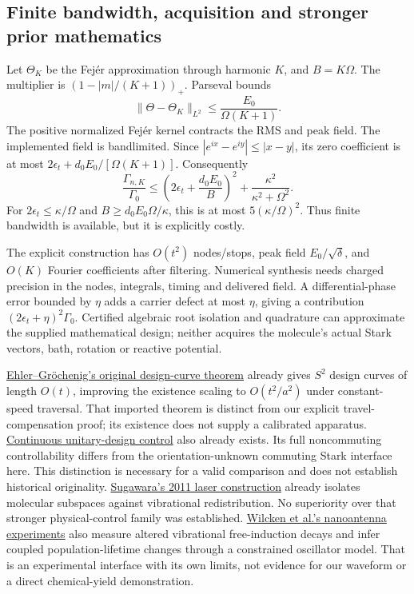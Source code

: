 \documentclass[11pt]{article}
\begin{document}
\subsection{Finite bandwidth, acquisition and stronger prior mathematics}

Let $\Theta_K$ be the Fej\'er approximation through harmonic $K$, and
$B=K\Omega$. The multiplier is $(1-|m|/(K+1))_+$.
Parseval bounds
\[
 \|\Theta-\Theta_K\|_{L^2}\le\frac{E_0}{\Omega(K+1)}.
\]
The positive normalized Fej\'er kernel contracts the RMS and peak field.
The implemented field is bandlimited. Since
$|e^{ix}-e^{iy}|\le|x-y|$, its zero coefficient is at most
$2\epsilon_t+d_0E_0/[\Omega(K+1)]$. Consequently
\begin{equation}\label{eq:bandwidth}
 \frac{\Gamma_{n,K}}{\Gamma_0}
 \le\left(2\epsilon_t+\frac{d_0E_0}{B}\right)^2
       +\frac{\kappa^2}{\kappa^2+\Omega^2}.
\end{equation}
For $2\epsilon_t\le\kappa/\Omega$ and
$B\ge d_0E_0\Omega/\kappa$, this is at most $5(\kappa/\Omega)^2$.
Thus finite bandwidth is available, but it is explicitly costly.

The explicit construction has $O(t^2)$ nodes/stops, peak field
$E_0/\sqrt\delta$, and $O(K)$ Fourier coefficients after filtering.
Numerical synthesis needs charged precision in the nodes, integrals, timing
and delivered field. A differential-phase error bounded by $\eta$ adds a
carrier defect at most $\eta$, giving a contribution
$(2\epsilon_t+\eta)^2\Gamma_0$. Certified algebraic root isolation and
quadrature can approximate the supplied mathematical design; neither acquires
the molecule's actual Stark vectors, bath, rotation or reactive potential.

\href{https://arxiv.org/abs/2306.13152}{Ehler--Gr\"ochenig's original design-curve theorem}
already gives $S^2$ design curves of length $O(t)$, improving the existence
scaling to $O(t^2/a^2)$ under constant-speed traversal.
That imported theorem is distinct from our explicit travel-compensation proof;
its existence does not supply a calibrated apparatus.
\href{https://arxiv.org/html/2601.01988v1}{Continuous unitary-design control}
also already exists. Its full noncommuting controllability differs from the
orientation-unknown commuting Stark interface here. This distinction is
necessary for a valid comparison and does not establish historical originality.
\href{https://doi.org/10.1155/2011/584082}{Sugawara's 2011 laser construction}
already isolates molecular subspaces against vibrational redistribution.
No superiority over that stronger physical-control family was established.
\href{https://doi.org/10.1073/pnas.2220852120}{Wilcken et al.'s nanoantenna experiments}
also measure altered vibrational free-induction decays and infer coupled
population-lifetime changes through a constrained oscillator model. That is
an experimental interface with its own limits, not evidence for our waveform
or a direct chemical-yield demonstration.
\end{document}
